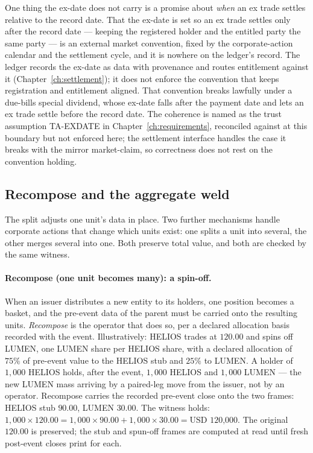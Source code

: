 \documentclass[11pt,a4paper]{article}
\newcommand{\USD}[1]{\mbox{USD~#1}}
\begin{document}
One thing the ex-date does not carry is a promise about \emph{when} an ex trade settles
relative to the record date. That the ex-date is set so an ex trade settles only after the
record date --- keeping the registered holder and the entitled party the same party --- is
an external market convention, fixed by the corporate-action calendar and the settlement
cycle, and it is nowhere on the ledger's record. The ledger records the ex-date as data
with provenance and routes entitlement against it (Chapter~\ref{ch:settlement}); it does not
enforce the convention that keeps registration and entitlement aligned. That convention
breaks lawfully under a due-bills special dividend, whose ex-date falls after the payment
date and lets an ex trade settle before the record date. The coherence is named as the
trust assumption TA-EXDATE in Chapter~\ref{ch:requirements}, reconciled against at this
boundary but not enforced here; the settlement interface handles the case it breaks with the
mirror market-claim, so correctness does not rest on the convention holding.

\subsection{Recompose and the aggregate weld}\label{sec:recompose}

The split adjusts one unit's data in place. Two further mechanisms handle corporate actions
that change which units exist: one splits a unit into several, the other merges several into
one. Both preserve total value, and both are checked by the same witness.

\paragraph{Recompose (one unit becomes many): a spin-off.}
When an issuer distributes a new entity to its holders, one position becomes a basket, and
the pre-event data of the parent must be carried onto the resulting units. \emph{Recompose}
is the operator that does so, per a declared allocation basis recorded with the event.
Illustratively: HELIOS trades at $120.00$ and spins off LUMEN, one LUMEN share per HELIOS
share, with a declared allocation of $75\%$ of pre-event value to the HELIOS stub and
$25\%$ to LUMEN. A holder of $1{,}000$ HELIOS holds, after the event, $1{,}000$ HELIOS and
$1{,}000$ LUMEN --- the new LUMEN mass arriving by a paired-leg move from the issuer, not by
an operator. Recompose carries the recorded pre-event close onto the two frames: HELIOS stub
$90.00$, LUMEN $30.00$. The witness holds: $1{,}000 \times 120.00 = 1{,}000 \times 90.00 +
1{,}000 \times 30.00 = \USD{120{,}000}$. The original $120.00$ is preserved; the stub and
spun-off frames are computed at read until fresh post-event closes print for each.
\end{document}

